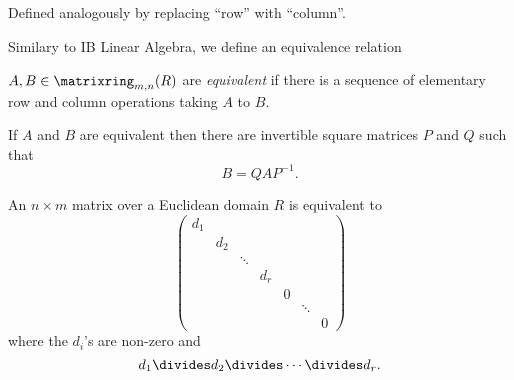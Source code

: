 \documentclass[a4paper]{article}
\theoremstyle{definition}
\begin{document}
\begin{definition}
  Defined analogously by replacing ``row'' with ``column''.
\end{definition}

Similary to IB Linear Algebra, we define an equivalence relation

\begin{definition}[Equivalence]
  \(A, B \in \matrixring_{m, n}(R)\) are \emph{equivalent} if there is a sequence of elementary row and column operations taking \(A\) to \(B\).
\end{definition}

If \(A\) and \(B\) are equivalent then there are invertible square matrices \(P\) and \(Q\) such that
\[
  B = QAP^{-1}.
\]

\begin{theorem}
  An \(n \times m\) matrix over a Euclidean domain \(R\) is equivalent to
  \[
    \begin{pmatrix}
      d_1 \\
      & d_2 \\
      & & \ddots \\
      & & & d_r \\
      & & & & 0 \\
      & & & & & \ddots \\
      & & & & & & 0
    \end{pmatrix}
  \]
  where the \(d_i\)'s are non-zero and
  \[
    d_1 \divides d_2 \divides \cdots \divides d_r.
  \]
\end{theorem}
\end{document}
